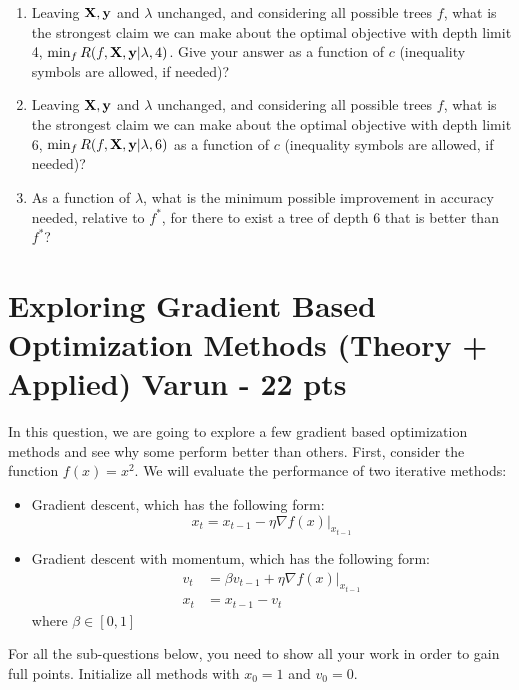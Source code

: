 \documentclass{exam}
\begin{document}
\begin{enumerate}[i]
    \item Leaving $\mathbf{X}, \mathbf{y}$ and $\lambda$ unchanged, and considering all possible trees $f$, what is the strongest claim we can make about the optimal objective with depth limit 4, $\min_{f}R(f, \mathbf{X}, \mathbf{y} | \lambda, 4)$. Give your answer as a function of $c$ (inequality symbols are allowed, if needed)?
    
    \item Leaving $\mathbf{X}, \mathbf{y}$ and $\lambda$ unchanged, and considering all possible trees $f$, what is the strongest claim we can make about the optimal objective with depth limit 6, $\min_{f}R(f, \mathbf{X}, \mathbf{y} | \lambda, 6)$ as a function of $c$ (inequality symbols are allowed, if needed)? 
    
    \item As a function of $\lambda$, what is the minimum possible improvement in accuracy needed, relative to $f^*$, for there to exist a tree of depth 6 that is better than $f^*$?
    

\end{enumerate}

\newpage

\section{Exploring Gradient Based Optimization Methods (Theory + Applied) Varun - 22 pts}
In this question, we are going to explore a few gradient based optimization methods and see why some perform better than others. First, consider the function $f(x) = x^2$. We will evaluate the performance of two iterative methods:
\begin{itemize}
    \item Gradient descent, which has the following form: 
\begin{equation}
    x_t = x_{t-1} - \eta \nabla f(x)\Big|_{x_{t-1}}
\end{equation}
\item Gradient descent with momentum, which has the following form: 
\begin{align}
    v_t &= \beta v_{t-1} + \eta \nabla f(x)\Big|_{x_{t-1}}\\
    x_t &= x_{t-1} - v_t
\end{align}
where $\beta \in [0,1]$
\end{itemize}
For all the sub-questions below, you need to show all your work in order to gain full points. Initialize all methods with $x_0 = 1$ and $v_0 = 0$.
\end{document}
